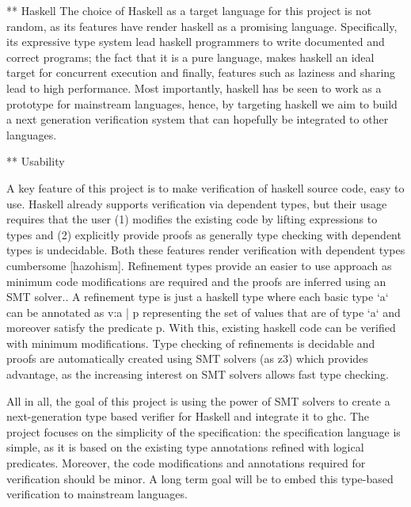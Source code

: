 \documentclass[10pt,a4paper]{article}
\begin{document}
** Haskell
The choice of Haskell as a target language for this project is not random, as its features have render haskell as a promising language.
Specifically, its expressive type system lead haskell programmers to write documented and  correct programs; the fact that it is a pure language, makes haskell an ideal target for concurrent execution and finally, features such as laziness and sharing lead to high performance. 
Most importantly, haskell has be seen to work as a prototype for mainstream languages,
hence, by targeting haskell we aim to build a next generation verification system that can hopefully be integrated to other languages.



** Usability

A key feature of this project is to make verification of haskell source code, easy to use.
Haskell already supports verification via dependent types, but their usage requires that the user
(1) modifies the existing code by lifting expressions to types
and (2) explicitly provide proofs as generally type checking with dependent types is undecidable.
Both these features render verification with dependent types cumbersome [hazohism].
%
Refinement types provide an easier to use approach as minimum code modifications are required 
and the proofs are inferred using an SMT solver..
%
A refinement type is just a haskell type where each basic type `a` can be annotated as 
{v:a | p} representing the set of values that are of type `a` and moreover satisfy the predicate p.
With this, existing haskell code can be verified with minimum modifications.
% 
Type checking of refinements is decidable and proofs are automatically created using SMT solvers (as z3) which provides advantage, as the increasing interest on SMT solvers allows fast type checking.

All in all, the goal of this project is using the power of SMT solvers to 
create a next-generation type based verifier for Haskell and integrate it to ghc.
The project focuses on the simplicity of the specification:
the specification language is simple, as it is based on the existing type annotations
refined with logical predicates.
Moreover, the code modifications and annotations required for verification should be minor.
A long term goal will be to embed this type-based verification to mainstream languages.







\end{document}
